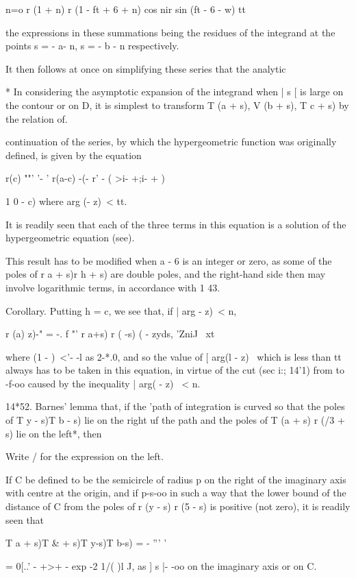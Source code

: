 n=o r (1 + n) r (1 - ft + 6 + n) cos nir sin (ft - 6 - w) tt

the expressions in these summations being the residues of the
integrand at the points s = - a- n, s = - b - n respectively.

It then follows at once on simplifying these series that the analytic

* In considering the asymptotic expansion of the integrand when | s [
is large on the contour or on D, it is simplest to transform T (a +
s), V (b + s), T c + s) by the relation of.

%
%

continuation of the series, by which the hypergeometric function was
originally defined, is given by the equation

r(c) ""' '- ' r(a-c) -(- r' - ( >i- +;i- + )

1 0 - c) where arg (- z)\ < tt.

It is readily seen that each of the three terms in this equation is a
solution of the hypergeometric equation (see).

This result has to be modified when a - 6 is an integer or zero, as
some of the poles of r a + s)r h + s) are double poles, and the
right-hand side then may involve logarithmic terms, in accordance with
1 43.

Corollary. Putting h = c, we see that, if | arg - z)\ < n,

r (a) z)-" = -. f "' r a+s) r ( -s) ( - zyds, 'ZniJ \ xt

where (1 - )~<'- -l as 2-*.0, and so the value of [ arg(l - z) \ which
is less than tt always has to be taken in this equation, in virtue of
the cut (sec i:; 14'1) from to -f-oo caused by the inequality | arg( -
z) \ < n.

14*52. Barnes' lemma that, if the 'path of integration is curved so
that the poles of T y - s)T b - s) lie on the right uf the path and
the poles of T (a + s) r (/3 + s) lie on the left*, then

Write / for the expression on the left.

If C be defined to be the semicircle of radius p on the right of the
imaginary axis with centre at the origin, and if p-s-oo in such a way
that the lower bound of the distance of C from the poles of r (y - s)
r (5 - s) is positive (not zero), it is readily seen that

T a + s)T \& + s)T y-s)T b-s) = - ''' '

= 0[..' - +>+ - exp -2 1/( )l J, as ] s |- -oo on the imaginary axis
or on C.

